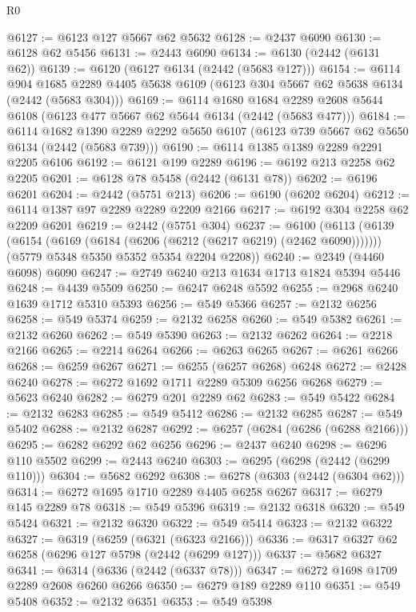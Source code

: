 \begin{lexlean}{R0}
\begin{coremodule}
@6127 := @6123 @127 @5667 @62 @5632
@6128 := @2437 @6090
@6130 := @6128 @62 @5456
@6131 := @2443 @6090
@6134 := @6130 (@2442 (@6131 @62))
@6139 := @6120 (@6127 @6134 (@2442 (@5683 @127)))
@6154 := @6114
    @904
    @1685
    @2289
    @4405
    @5638
    @6109
    (@6123 @304 @5667 @62 @5638 @6134 (@2442 (@5683 @304)))
@6169 := @6114
    @1680
    @1684
    @2289
    @2608
    @5644
    @6108
    (@6123 @477 @5667 @62 @5644 @6134 (@2442 (@5683 @477)))
@6184 := @6114
    @1682
    @1390
    @2289
    @2292
    @5650
    @6107
    (@6123 @739 @5667 @62 @5650 @6134 (@2442 (@5683 @739)))
@6190 := @6114 @1385 @1389 @2289 @2291 @2205 @6106
@6192 := @6121 @199 @2289
@6196 := @6192 @213 @2258 @62 @2205
@6201 := @6128 @78 @5458 (@2442 (@6131 @78))
@6202 := @6196 @6201
@6204 := @2442 (@5751 @213)
@6206 := @6190 (@6202 @6204)
@6212 := @6114 @1387 @97 @2289 @2289 @2209 @2166
@6217 := @6192 @304 @2258 @62 @2209 @6201
@6219 := @2442 (@5751 @304)
@6237 := @6100
    (@6113
      (@6139 (@6154 (@6169 (@6184 (@6206 (@6212 (@6217 @6219) (@2462 @6090)))))))
      (@5779 @5348 @5350 @5352 @5354 @2204 @2208))
@6240 := @2349 (@4460 @6098) @6090
@6247 := @2749 @6240 @213 @1634 @1713 @1824 @5394 @5446
@6248 := @4439 @5509
@6250 := @6247 @6248 @5592
@6255 := @2968 @6240 @1639 @1712 @5310 @5393
@6256 := @549 @5366
@6257 := @2132 @6256
@6258 := @549 @5374
@6259 := @2132 @6258
@6260 := @549 @5382
@6261 := @2132 @6260
@6262 := @549 @5390
@6263 := @2132 @6262
@6264 := @2218 @2166
@6265 := @2214 @6264
@6266 := @6263 @6265
@6267 := @6261 @6266
@6268 := @6259 @6267
@6271 := @6255 (@6257 @6268) @6248
@6272 := @2428 @6240
@6278 := @6272 @1692 @1711 @2289 @5309 @6256 @6268
@6279 := @5623 @6240
@6282 := @6279 @201 @2289 @62
@6283 := @549 @5422
@6284 := @2132 @6283
@6285 := @549 @5412
@6286 := @2132 @6285
@6287 := @549 @5402
@6288 := @2132 @6287
@6292 := @6257 (@6284 (@6286 (@6288 @2166)))
@6295 := @6282 @6292 @62 @6256
@6296 := @2437 @6240
@6298 := @6296 @110 @5502
@6299 := @2443 @6240
@6303 := @6295 (@6298 (@2442 (@6299 @110)))
@6304 := @5682 @6292
@6308 := @6278 (@6303 (@2442 (@6304 @62)))
@6314 := @6272 @1695 @1710 @2289 @4405 @6258 @6267
@6317 := @6279 @145 @2289 @78
@6318 := @549 @5396
@6319 := @2132 @6318
@6320 := @549 @5424
@6321 := @2132 @6320
@6322 := @549 @5414
@6323 := @2132 @6322
@6327 := @6319 (@6259 (@6321 (@6323 @2166)))
@6336 := @6317 @6327 @62 @6258 (@6296 @127 @5798 (@2442 (@6299 @127)))
@6337 := @5682 @6327
@6341 := @6314 (@6336 (@2442 (@6337 @78)))
@6347 := @6272 @1698 @1709 @2289 @2608 @6260 @6266
@6350 := @6279 @189 @2289 @110
@6351 := @549 @5408
@6352 := @2132 @6351
@6353 := @549 @5398

\end{coremodule}
\end{lexlean}
